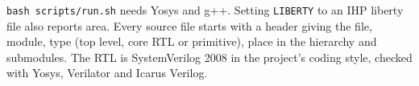 \documentclass[11pt,a4paper]{article}
\newcommand{\sig}[1]{\texttt{#1}}
\begin{document}
\sig{bash scripts/run.sh} needs Yosys and g++. Setting \sig{LIBERTY} to an IHP liberty file also reports area. Every source file starts with a header giving the file, module, type (top level, core RTL or primitive), place in the hierarchy and submodules. The RTL is SystemVerilog 2008 in the project's coding style, checked with Yosys, Verilator and Icarus Verilog.
\end{document}
